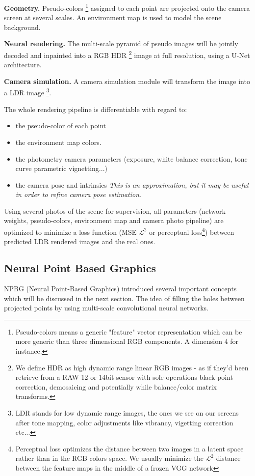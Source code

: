 \noindent\textbf{Geometry.} Pseudo-colors  \footnote{Pseudo-colors means a generic "feature" vector representation which can be more generic than three dimensional RGB components. A dimension 4 for instance.} assigned to each point are projected onto the camera screen at several scales. An environment map is used to model the scene background.

\noindent\textbf{Neural rendering.} The multi-scale pyramid of pseudo images will be jointly decoded and inpainted into a RGB HDR \footnote{We define HDR as high dynamic range linear RGB images - as if they'd been retrieve from a RAW 12 or 14bit sensor with sole operations black point correction, demosaicing and potentially while balance/color matrix transforms.} image at full resolution, using a U-Net architecture.

\noindent\textbf{Camera simulation.} A camera simulation module will transform the image into a LDR image \footnote{LDR stands for low dynamic range images, the ones we see on our screens after tone mapping, color adjustments like vibrancy, vigetting correction etc...}. 

\noindent The whole rendering pipeline is differentiable with regard to:
\begin{itemize}
    \item the pseudo-color of each point
    \item the environment map colors.
    \item the photometry camera parameters (exposure, white balance correction, tone curve parametric vignetting...)
    \item the camera pose and intrinsics \textit{This is an approximation, but it may be useful in order to refine camera pose estimation}. 
\end{itemize}

Using several photos of the scene for supervision, all parameters (network weights, pseudo-colors, environment map and camera photo pipeline) are optimized to minimize a loss function (MSE $\mathcal{L}^{2}$ or perceptual loss\footnote{Perceptual loss \cite{johnson2016perceptual} optimizes the distance between two images in a latent space rather than in the RGB colors space. We usually minimize the $\mathcal{L}^{2}$ distance between the feature maps in the middle of a frozen VGG network}) between predicted LDR rendered images and the real ones. 



\subsection{Neural Point Based Graphics}
\label{subsec:npbg}
NPBG \cite{Aliev2020} (Neural Point-Based Graphics) introduced several important concepts which will be discussed in the next section.
The idea of filling the holes between projected points by using multi-scale convolutional neural networks.  

